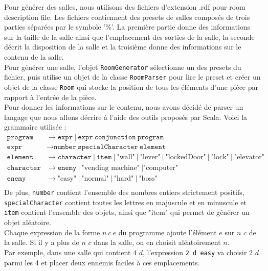 \documentclass[10pt,a4paper]{article}
\begin{document}
Pour générer des salles, nous utilisons des fichiers d'extension .rdf pour room description file. Les fichiers contiennent des presets de salles composés de trois parties séparées par le symbole '\%'. La première partie donne des informations sur la taille de la salle ainsi que l'emplacement des sorties de la salle, la seconde décrit la disposition de la salle et la troisième donne des informations sur le contenu de la salle.\\
Pour générer une salle, l'objet \texttt{RoomGenerator} sélectionne un des presets du fichier, puis utilise un objet de la classe \texttt{RoomParser} pour lire le preset et créer un objet de la classe \texttt{Room} qui stocke la position de tous les éléments d'une pièce par rapport à l'entrée de la pièce.\\
Pour donner les informations sur le contenu, nous avons décidé de parser un langage que nous allons décrire à l'aide des outils proposés par Scala. Voici la grammaire utilisée :\\
\begin{align*}
	\texttt{program}   & \to \texttt{expr}\ |\ \texttt{expr}\ \texttt{conjunction}\ \texttt{program}                                                                   \\
	\texttt{expr}      & \to \texttt{number}\ \texttt{specialCharacter}\ \texttt{element}                                                                              \\
	\texttt{element}   & \to \texttt{character}\ |\ \texttt{item}\ |\ \mbox{"wall"}\ |\ \mbox{"lever"}\ |\ \mbox{"lockedDoor"}\ |\ \mbox{"lock"}\ |\ \mbox{"elevator"} \\
	\texttt{character} & \to \texttt{enemy}\ |\ \mbox{"vending machine"}\ | \mbox{"computer"}                                                                          \\
	\texttt{enemy}     & \to \mbox{"easy"}\ |\ \mbox{"normal"}\ |\ \mbox{"hard"}\ |\ \mbox{"boss"}                                                                     \\
\end{align*}
De plus, \texttt{number} contient l'ensemble des nombres entiers strictement positifs, \texttt{specialCharacter} contient toutes les lettres en majuscule et en minuscule et \texttt{item} contient l'ensemble des objets, ainsi que "item" qui permet de générer un objet aléatoire.\\
Chaque expression de la forme $n\ c\ e$ du programme ajoute l'élément $e$ sur $n$ $c$ de la salle. Si il y a plus de $n$ $c$ dans la salle, on en choisit aléatoirement $n$.\\
Par exemple, dans une salle qui contient $4$ $d$, l'expression \texttt{2 d easy} va choisir 2 $d$ parmi les 4 et placer deux ennemis faciles à ces emplacements.\\
\end{document}
